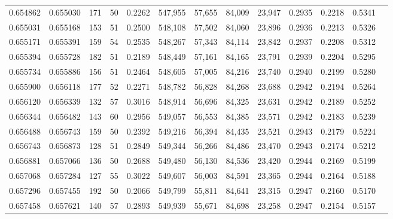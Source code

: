 \begin{tabular}{rrrrrrrrrrrrr}
0.654862 & 0.655030 &   171 &  50 &                                     0.2262 & 547,955 &  57,655 &  84,009 &  23,947 & 0.2935 & 0.2218 & 0.5341 \\
0.655031 & 0.655168 &   153 &  51 &                                     0.2500 & 548,108 &  57,502 &  84,060 &  23,896 & 0.2936 & 0.2213 & 0.5326 \\
0.655171 & 0.655391 &   159 &  54 &                                     0.2535 & 548,267 &  57,343 &  84,114 &  23,842 & 0.2937 & 0.2208 & 0.5312 \\
0.655394 & 0.655728 &   182 &  51 &                                     0.2189 & 548,449 &  57,161 &  84,165 &  23,791 & 0.2939 & 0.2204 & 0.5295 \\
0.655734 & 0.655886 &   156 &  51 &                                     0.2464 & 548,605 &  57,005 &  84,216 &  23,740 & 0.2940 & 0.2199 & 0.5280 \\
0.655900 & 0.656118 &   177 &  52 &                                     0.2271 & 548,782 &  56,828 &  84,268 &  23,688 & 0.2942 & 0.2194 & 0.5264 \\
0.656120 & 0.656339 &   132 &  57 &                                     0.3016 & 548,914 &  56,696 &  84,325 &  23,631 & 0.2942 & 0.2189 & 0.5252 \\
0.656344 & 0.656482 &   143 &  60 &                                     0.2956 & 549,057 &  56,553 &  84,385 &  23,571 & 0.2942 & 0.2183 & 0.5239 \\
0.656488 & 0.656743 &   159 &  50 &                                     0.2392 & 549,216 &  56,394 &  84,435 &  23,521 & 0.2943 & 0.2179 & 0.5224 \\
0.656743 & 0.656873 &   128 &  51 &                                     0.2849 & 549,344 &  56,266 &  84,486 &  23,470 & 0.2943 & 0.2174 & 0.5212 \\
0.656881 & 0.657066 &   136 &  50 &                                     0.2688 & 549,480 &  56,130 &  84,536 &  23,420 & 0.2944 & 0.2169 & 0.5199 \\
0.657068 & 0.657284 &   127 &  55 &                                     0.3022 & 549,607 &  56,003 &  84,591 &  23,365 & 0.2944 & 0.2164 & 0.5188 \\
0.657296 & 0.657455 &   192 &  50 &                                     0.2066 & 549,799 &  55,811 &  84,641 &  23,315 & 0.2947 & 0.2160 & 0.5170 \\
0.657458 & 0.657621 &   140 &  57 &                                     0.2893 & 549,939 &  55,671 &  84,698 &  23,258 & 0.2947 & 0.2154 & 0.5157 \\

\end{tabular}
